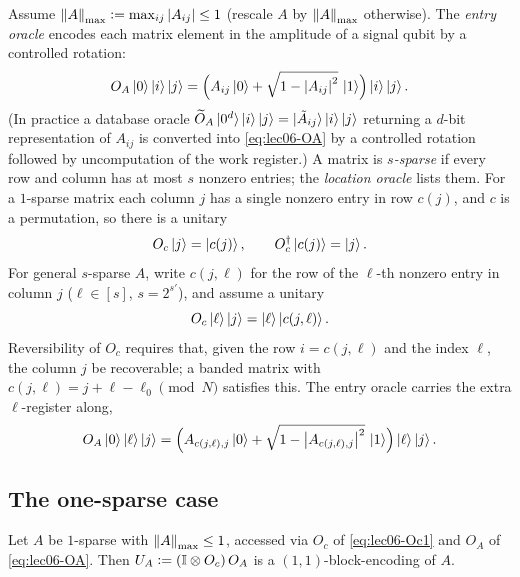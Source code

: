 Assume $\left\lVert A \right\rVert_{\max}\vcentcolon=\max_{ij}\left\lvert A_{ij} \right\rvert\le1$ (rescale $A$ by
$\left\lVert A \right\rVert_{\max}$ otherwise). The \emph{entry oracle} encodes each matrix element in
the amplitude of a signal qubit by a controlled rotation:
\begin{equation}
  O_A\ket{0}\ket{i}\ket{j}
   =\Bigl(A_{ij}\ket{0}+\sqrt{1-\left\lvert A_{ij} \right\rvert^2}\,\ket{1}\Bigr)\ket{i}\ket{j}.
  \label{eq:lec06-OA}
\end{equation}
(In practice a database oracle
$\widetilde O_A\ket{0^{d}}\ket{i}\ket{j}=\ket{\tilde A_{ij}}\ket{i}\ket{j}$ returning
a $d$-bit representation of $A_{ij}$ is converted into \eqref{eq:lec06-OA} by a
controlled rotation followed by uncomputation of the work register.) A matrix is
\emph{$s$-sparse} if every row and column has at most $s$ nonzero entries; the
\emph{location oracle} lists them. For a $1$-sparse matrix each column $j$ has a
single nonzero entry in row $c(j)$, and $c$ is a permutation, so there is a unitary
\begin{equation}
  O_c\ket{j}=\ket{c(j)},\qquad O_c^{\dagger}\ket{c(j)}=\ket{j}.
  \label{eq:lec06-Oc1}
\end{equation}
For general $s$-sparse $A$, write $c(j,\ell)$ for the row of the $\ell$-th nonzero
entry in column $j$ ($\ell\in[s]$, $s=2^{s'}$), and assume a unitary
\begin{equation}
  O_c\ket{\ell}\ket{j}=\ket{\ell}\ket{c(j,\ell)}.
  \label{eq:lec06-Ocs}
\end{equation}
Reversibility of $O_c$ requires that, given the row $i=c(j,\ell)$ and the index
$\ell$, the column $j$ be recoverable; a banded matrix with
$c(j,\ell)=j+\ell-\ell_0\pmod N$ satisfies this. The entry oracle carries the extra
$\ell$-register along,
\begin{equation}
  O_A\ket{0}\ket{\ell}\ket{j}
   =\Bigl(A_{c(j,\ell),j}\ket{0}
     +\sqrt{1-\left\lvert A_{c(j,\ell),j} \right\rvert^2}\,\ket{1}\Bigr)\ket{\ell}\ket{j}.
  \label{eq:lec06-OAs}
\end{equation}

\subsection*{The one-sparse case}

\begin{proposition}
\label{prop:lec06-1sparse}
Let $A$ be $1$-sparse with $\left\lVert A \right\rVert_{\max}\le1$, accessed via $O_c$ of
\eqref{eq:lec06-Oc1} and $O_A$ of \eqref{eq:lec06-OA}. Then
$U_A\vcentcolon=(\mathbb{I}\otimes O_c)\,O_A$ is a $(1,1)$-block-encoding of $A$.
\end{proposition}

